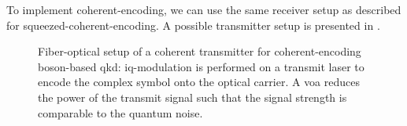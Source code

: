 To implement coherent-encoding, we can use the same receiver setup as described for squeezed-coherent-encoding.
A possible transmitter setup is presented in \label{fig:coherent_transmitter}.
\begin{figure}[htb]
	\centering
	
	\caption{Fiber-optical setup of a coherent transmitter for coherent-encoding boson-based \gls{qkd}: \gls{iq}-modulation is performed on a transmit laser to encode the complex symbol onto the optical carrier. A \gls{voa} reduces the power of the transmit signal such that the signal strength is comparable to the quantum noise.}\label{fig:coherent_transmitter}
\end{figure}